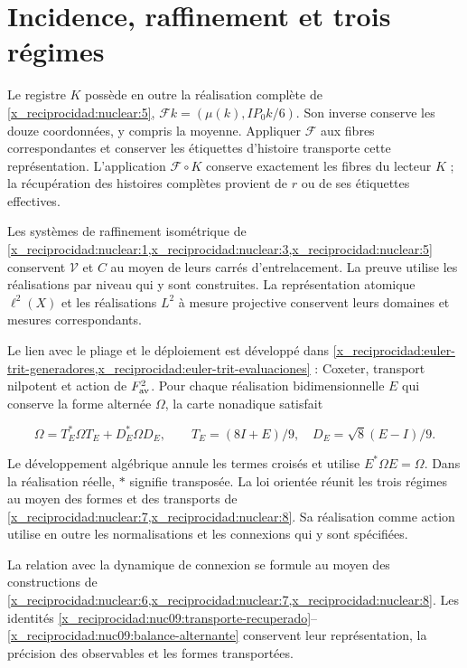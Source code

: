\section{Incidence, raffinement et trois régimes}

Le registre \(K\) possède en outre la réalisation complète de
\cref{x_reciprocidad:nuclear:5},
\(\mathcal Fk=(\mu(k),IP_0k/6)\).
Son inverse conserve les douze coordonnées, y compris la moyenne.
Appliquer \(\mathcal F\) aux fibres correspondantes et conserver
les étiquettes d’histoire transporte cette représentation.
L’application \(\mathcal F\circ K\) conserve exactement les fibres
du lecteur \(K\) ; la récupération des histoires complètes provient
de \(r\) ou de ses étiquettes effectives.

Les systèmes de raffinement isométrique de
\cref{x_reciprocidad:nuclear:1,x_reciprocidad:nuclear:3,x_reciprocidad:nuclear:5} conservent
\(\mathcal V\) et \(C\) au moyen de leurs carrés d’entrelacement.
La preuve utilise les réalisations par niveau qui y sont construites.
La représentation atomique \(\ell^2(X)\) et les réalisations
\(L^2\) à mesure projective conservent leurs domaines
et mesures correspondants.

Le lien avec le pliage et le déploiement est développé dans
\cref{x_reciprocidad:euler-trit-generadores,x_reciprocidad:euler-trit-evaluaciones} :
Coxeter, transport nilpotent et action de \(F_{\rm av}^2\).
Pour chaque réalisation bidimensionnelle \(E\) qui conserve la forme
alternée \(\Omega\), la carte nonadique satisfait




\begin{equation}
\Omega=T_E^*\Omega T_E+D_E^*\Omega D_E,
\qquad T_E=(8I+E)/9,\quad D_E=\sqrt8(E-I)/9.
\label{x_reciprocidad:nuc09:balance-alternante}
\end{equation}



Le développement algébrique annule les termes croisés et utilise
\(E^*\Omega E=\Omega\). Dans la réalisation réelle,
\(*\) signifie transposée.
La loi orientée réunit les trois régimes au moyen des formes
et des transports de \cref{x_reciprocidad:nuclear:7,x_reciprocidad:nuclear:8}.
Sa réalisation comme action utilise en outre les normalisations
et les connexions qui y sont spécifiées.

La relation avec la dynamique de connexion se formule au moyen
des constructions de \cref{x_reciprocidad:nuclear:6,x_reciprocidad:nuclear:7,x_reciprocidad:nuclear:8}.
Les identités
\eqref{x_reciprocidad:nuc09:transporte-recuperado}--\eqref{x_reciprocidad:nuc09:balance-alternante}
conservent leur représentation, la précision des observables
et les formes transportées.
